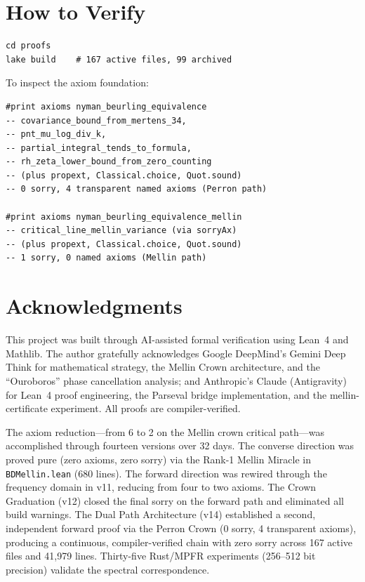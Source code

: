\documentclass[12pt,a4paper]{article}
\begin{document}
\section{How to Verify}

\begin{verbatim}
cd proofs
lake build    # 167 active files, 99 archived
\end{verbatim}

\noindent To inspect the axiom foundation:
\begin{verbatim}
#print axioms nyman_beurling_equivalence
-- covariance_bound_from_mertens_34,
-- pnt_mu_log_div_k,
-- partial_integral_tends_to_formula,
-- rh_zeta_lower_bound_from_zero_counting
-- (plus propext, Classical.choice, Quot.sound)
-- 0 sorry, 4 transparent named axioms (Perron path)

#print axioms nyman_beurling_equivalence_mellin
-- critical_line_mellin_variance (via sorryAx)
-- (plus propext, Classical.choice, Quot.sound)
-- 1 sorry, 0 named axioms (Mellin path)
\end{verbatim}

\section*{Acknowledgments}

This project was built through AI-assisted formal verification using
Lean~4 and Mathlib. The author gratefully acknowledges
Google DeepMind's Gemini Deep Think for mathematical strategy,
the Mellin Crown architecture, and the ``Ouroboros'' phase cancellation
analysis; and Anthropic's Claude (Antigravity) for Lean~4 proof engineering,
the Parseval bridge implementation, and the mellin-certificate experiment.
All proofs are compiler-verified.

The axiom reduction---from 6 to 2 on the Mellin crown critical path---was
accomplished through fourteen versions over 32 days.
The converse direction was proved pure (zero axioms, zero sorry) via
the Rank-1 Mellin Miracle in \texttt{BDMellin.lean} (680 lines).
The forward direction was rewired through the frequency domain in v11,
reducing from four to two axioms. The Crown Graduation (v12) closed the
final sorry on the forward path and eliminated all build warnings.
The Dual Path Architecture (v14) established a second, independent
forward proof via the Perron Crown (0 sorry, 4 transparent axioms),
producing a continuous, compiler-verified chain with zero sorry across
167 active files and 41{,}979 lines. Thirty-five Rust/MPFR experiments
(256--512 bit precision) validate the spectral correspondence.
\end{document}
